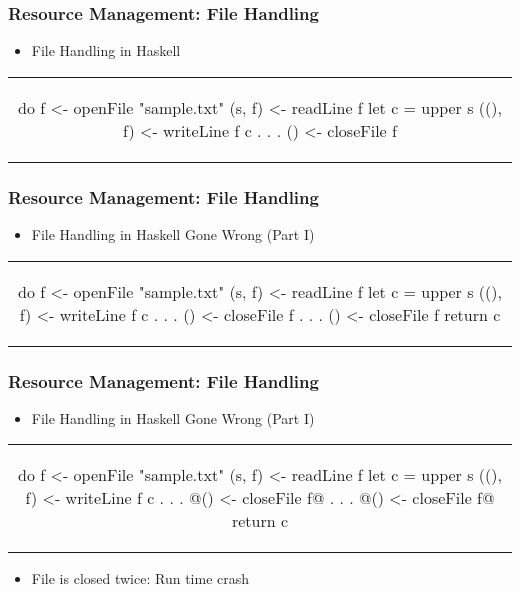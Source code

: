 \begin{frame}[fragile,c]
  \frametitle{Resource Management: File Handling}
  \begin{center}
    \begin{itemize}
    \item File Handling in Haskell
    \end{itemize}
    \begin{tabular}[h]{c}
      \begin{haskell}
        do f  <- openFile "sample.txt"
           (s, f)  <- readLine f
           let c = upper s
           ((), f) <- writeLine f c
                  .
                  .
                  .
           () <- closeFile f
      \end{haskell}
    \end{tabular}
  \end{center}
\end{frame}

\begin{frame}[fragile, c]
  \frametitle{Resource Management: File Handling}
  \begin{center}
    \begin{itemize}
    \item File Handling in Haskell Gone Wrong (Part I)
    \end{itemize}
    \begin{tabular}[h]{c}
    \begin{haskell}
      do f  <- openFile "sample.txt"
         (s, f)  <- readLine f
         let c = upper s
         ((), f) <- writeLine f c
              .
              .
              .
         () <- closeFile f
              .
              .
              .
         () <- closeFile f
         return c
    \end{haskell}
    \end{tabular}
  \end{center}
\end{frame}

\begin{frame}[fragile, c]
  \frametitle{Resource Management: File Handling}
  \begin{center}
    \begin{itemize}
    \item File Handling in Haskell Gone Wrong (Part I)
    \end{itemize}
    \begin{tabular}[h]{c}
    \begin{haskell}
      do f  <- openFile "sample.txt"
         (s, f)  <- readLine f
         let c = upper s
         ((), f) <- writeLine f c
              .
              .
              .
        @() <- closeFile f@
              .
              .
              .
        @() <- closeFile f@
         return c
    \end{haskell}
    \end{tabular}
    \begin{itemize}
    \item File is closed twice: Run time crash
    \end{itemize}
  \end{center}
\end{frame}

